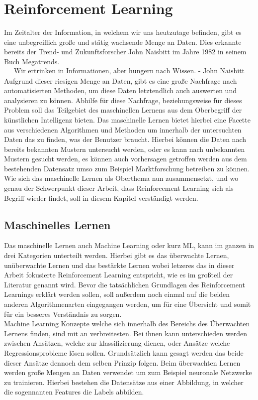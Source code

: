 \documentclass[]{iat}
\begin{document}
\chapter{Reinforcement Learning}
Im Zeitalter der Information, in welchem wir uns heutzutage befinden, gibt es eine unbegreiflich große und stätig wachsende Menge an Daten. Dies erkannte bereits der Trend- und Zukunftsforscher John Naisbitt im Jahre 1982 in seinem Buch Megatrends.
\begin{align*}
	\text{Wir ertrinken in Informationen, aber hungern nach Wissen. - John Naisbitt}
\end{align*}
Aufgrund dieser riesigen Menge an Daten, gibt es eine große Nachfrage nach automatisierten Methoden, um diese Daten letztendlich auch auswerten und analysieren zu können. Abhilfe für diese Nachfrage, beziehungsweise für dieses Problem soll das Teilgebiet des maschinellen Lernens aus dem Oberbegriff der künstlichen Intelligenz bieten. Das maschinelle Lernen bietet hierbei eine Facette aus verschiedenen Algorithmen und Methoden um innerhalb der untersuchten Daten das zu finden, was der Benutzer braucht. Hierbei können die Daten nach bereits bekannten Mustern untersucht werden, oder es kann nach unbekannten Mustern gesucht werden, es können auch vorhersagen getroffen werden aus dem bestehenden Datensatz umso zum Beispiel Marktforschung betreiben zu können. Wie sich das maschinelle Lernen als Oberthema nun zusammensetzt, und wo genau der Schwerpunkt dieser Arbeit, dass Reinforcement Learning sich als Begriff wieder findet, soll in diesem Kapitel verständigt werden.

\section{Maschinelles Lernen}
Das maschinelle Lernen auch Machine Learning oder kurz ML, kann im ganzen in drei Kategorien unterteilt werden. Hierbei gibt es das überwachte Lernen, unüberwachte Lernen und das bestärkte Lernen wobei letzeres das in dieser Arbeit fokusierte Reinforcement Learning entspricht, wie es im großteil der Literatur genannt wird. Bevor die tatsächlichen Grundlagen des Reinforcement Learnings erklärt werden sollen, soll außerdem noch einmal auf die beiden anderen Algorithmenarten eingegangen werden, um für eine Übersicht und somit für ein besseres Verständnis zu sorgen.\\
Machine Learning Konzepte welche sich innerhalb des Bereichs des Überwachten Lernens finden, sind mit an verbreitesten. Bei ihnen kann unterschieden werden zwischen Ansätzen, welche zur klassifizierung dienen, oder Ansätze welche Regressionsprobleme lösen sollen. Grundsätzlich kann gesagt werden das beide dieser Ansätze dennoch dem selben Prinzip folgen. Beim überwachten Lernen werden große Mengen an Daten verwendet um zum Beispiel neuronale Netzwerke zu trainieren. Hierbei bestehen die Datensätze aus einer Abbildung, in welcher die sogennanten Features die Labels abbilden.
\end{document}
